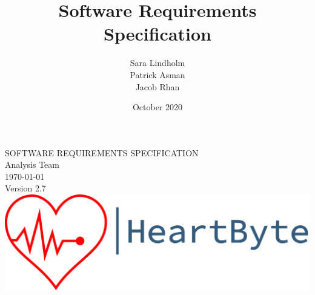 \documentclass{scrreprt}
\title{Software Requirements Specification}
\author{Sara Lindholm \\ Patrick Asman \\ Jacob Rhan}
\date{October 2020}
\def\myversion{2.7}
\begin{document}
\begin{titlepage}
    \begin{center}
    \begin{bfseries}
        \Huge{SOFTWARE REQUIREMENTS SPECIFICATION}\\
        \vspace{1.5cm}
        \LARGE Analysis Team \\
        \vspace{1.5cm}
        \today\\
        \vspace{1.5cm}
        {Version \myversion}\\
        \vfill
        \includegraphics[width=\linewidth]{Pictures/logo.png} \\
    \end{bfseries}
    \end{center}
\end{titlepage}
\end{document}
